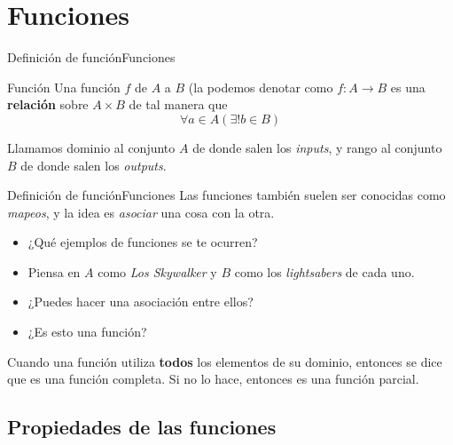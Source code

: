 \documentclass[spanish, c]{beamer}
\begin{document}
\section{Funciones}

\begin{frame}{Definición de función}{Funciones}

    \begin{block}{Función}
        Una \alert{función} $f$  de $A$ a $B$ (la podemos denotar como $f : A \to B$ es una \textbf{relación} sobre $A \times B$ de tal manera que
        $$\forall a \in A(\exists! b \in B)$$    
    \end{block} \pause
    
    \bigskip

    Llamamos \alert{dominio} al conjunto $A$ de donde salen los \textit{inputs}, y \alert{rango} al conjunto $B$ de donde salen los \textit{outputs}.

\end{frame}

\begin{frame}{Definición de función}{Funciones}
    Las funciones también suelen ser conocidas como \textit{mapeos}, y la idea es \textit{asociar} una cosa con la otra. \pause

    \bigskip
    \begin{itemize}
        \item ¿Qué ejemplos de funciones se te ocurren? \pause
        \item Piensa en $A$ como \textit{Los Skywalker} y $B$ como los \textit{lightsabers} de cada uno. \pause
        \item ¿Puedes hacer una asociación entre ellos? \pause
        \item ¿Es esto una función?
    \end{itemize} \pause

    \bigskip

    Cuando una función utiliza \textbf{todos} los elementos de su dominio, entonces se dice que es una \alert{función completa}. Si no lo hace, entonces es una \alert{función parcial}.

\end{frame}

\subsection{Propiedades de las funciones}
\end{document}
